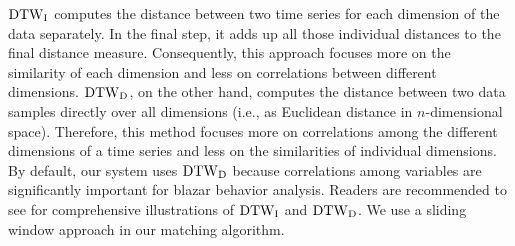 ${\rm DTW}_{\rm I}$ computes the distance between two time series for each dimension of the data separately. %
In the final step, it adds up all those individual distances to the final distance measure.
Consequently, this approach focuses more on the similarity of each dimension and less on correlations between different dimensions.
${\rm DTW}_{\rm D}$, on the other hand, computes the distance between two data samples directly over all dimensions (i.e., as Euclidean distance in $n$-dimensional space).
Therefore, this method focuses more on correlations among the different dimensions of a time series and less on the similarities of individual dimensions. 
By default, our system uses ${\rm DTW}_{\rm D}$ because correlations among variables are significantly important for blazar behavior analysis.
Readers are recommended to see \cite[Fig. 1]{Shokoohi-Yekta2015} for comprehensive illustrations of ${\rm DTW}_{\rm I}$ and ${\rm DTW}_{\rm D}$.
We use a sliding window approach in our matching algorithm.
